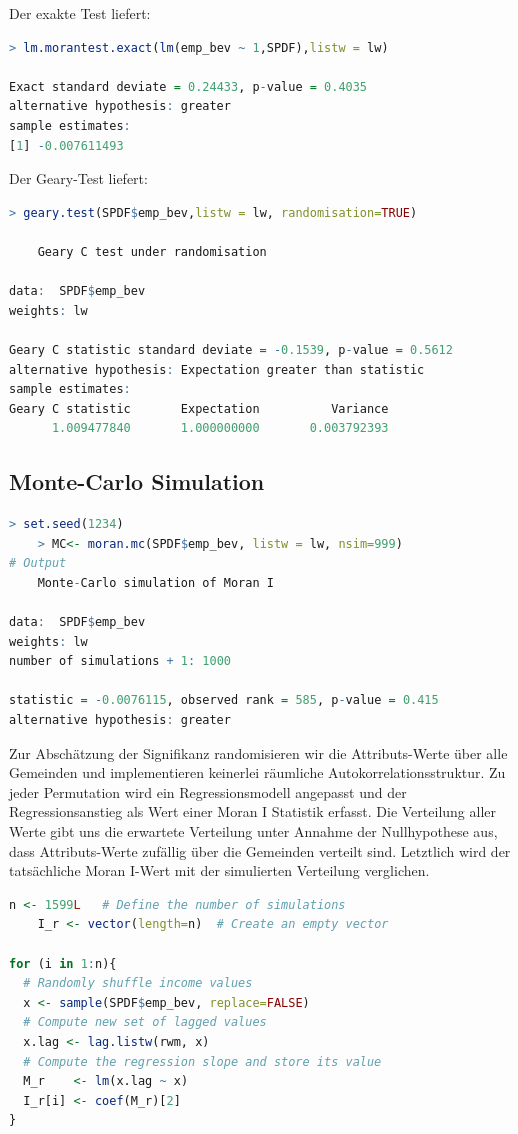 Der exakte Test liefert:
\begin{lstlisting}[language=R]
    > lm.morantest.exact(lm(emp_bev ~ 1,SPDF),listw = lw)

Exact standard deviate = 0.24433, p-value = 0.4035
alternative hypothesis: greater
sample estimates:
[1] -0.007611493
\end{lstlisting}
Der Geary-Test liefert:
\begin{lstlisting}[language=R]
    > geary.test(SPDF$emp_bev,listw = lw, randomisation=TRUE)

	Geary C test under randomisation

data:  SPDF$emp_bev 
weights: lw 

Geary C statistic standard deviate = -0.1539, p-value = 0.5612
alternative hypothesis: Expectation greater than statistic
sample estimates:
Geary C statistic       Expectation          Variance 
      1.009477840       1.000000000       0.003792393
\end{lstlisting}




\subsection{Monte-Carlo Simulation}

\begin{lstlisting}[language=R]
    > set.seed(1234)
    > MC<- moran.mc(SPDF$emp_bev, listw = lw, nsim=999)
# Output
	Monte-Carlo simulation of Moran I

data:  SPDF$emp_bev 
weights: lw  
number of simulations + 1: 1000 

statistic = -0.0076115, observed rank = 585, p-value = 0.415
alternative hypothesis: greater
\end{lstlisting}

Zur Abschätzung der Signifikanz randomisieren wir die Attributs-Werte über alle 
Gemeinden und implementieren keinerlei räumliche Autokorrelationsstruktur.
Zu jeder Permutation wird ein Regressionsmodell angepasst und der Regressionsanstieg 
als Wert einer Moran I Statistik erfasst.
Die Verteilung aller Werte gibt uns die erwartete Verteilung unter Annahme der Nullhypothese aus, 
dass Attributs-Werte zufällig über die Gemeinden verteilt sind.
Letztlich wird der tatsächliche Moran I-Wert mit der simulierten Verteilung verglichen.

\begin{lstlisting}[language=R]
    n <- 1599L   # Define the number of simulations
    I_r <- vector(length=n)  # Create an empty vector

for (i in 1:n){
  # Randomly shuffle income values
  x <- sample(SPDF$emp_bev, replace=FALSE)
  # Compute new set of lagged values
  x.lag <- lag.listw(rwm, x)
  # Compute the regression slope and store its value
  M_r    <- lm(x.lag ~ x)
  I_r[i] <- coef(M_r)[2]
}
\end{lstlisting}

